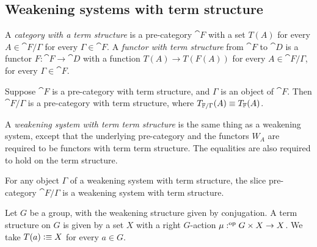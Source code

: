 \begin{comment}
\begin{eg}
In a poset with meets, the functions $W_{a,b}:{\downarrow}(b)\to{\downarrow}(a)$
given by $W_{a,b}(x)\defeq a\land x$ assemble a weakening structure, because for
any $a\leq b$ and $x,c'\leq c\leq b$ we have $a\land(c'\land x)\jdeq (a\land c')\land
(a\land x)$.  
\end{eg}

\begin{eg}
Consider the poset $(\N,\geq)$, which has a morphism from $a$ to $b$ if $a\geq b$.
On this poset, we may consider the weakening structure defined by $W_{a,b}(x)\jdeq
a+(x-b)$.
\end{eg}
\end{comment}

\subsection{Weakening systems with term structure}
\begin{defn}
A \emph{category with a term structure} is a pre-category $\cat{F}$ with a set $T(A)$ for every
$A\in\cat{F}/\Gamma$ for every $\Gamma\in\cat{F}$. A \emph{functor with term structure} from $\cat{F}$ to $\cat{D}$
is a functor $F:\cat{F}\to\cat{D}$ with a function $T(A)\to T(F(A))$ for
every $A\in\cat{F}/\Gamma$, for every $\Gamma\in\cat{F}$.
\end{defn}

\begin{defn}
Suppose $\cat{F}$ is a pre-category with term structure, and $\Gamma$ is an object of $\cat{F}$. 
Then $\cat{F}/\Gamma$ is a pre-category with term structure, where $T_{\mathbb{F}/\Gamma}(A)\equiv T_\mathbb{F}(A)$.
\end{defn}

\begin{defn}
A \emph{weakening system with term term structure} is the same thing as a weakening system,
except that the underlying pre-category and the functors $W_A$ are required to
be functors with term term structure. The equalities are also required to hold on the term structure.
\end{defn}

\begin{cor}
For any object $\Gamma$ of a weakening system with term structure, the slice pre-category
$\cat{F}/\Gamma$ is a weakening system with term structure.
\end{cor}

\begin{eg}

Let $G$ be a group, with the weakening structure given by conjugation. A term
structure on $G$ is given by a set $X$ with a right $G$-action $\mu:^{\mathrm{op}} G\times X\to X$.
We take $T(a)\vcentcolon\equiv X$ for every $a\in G$.
\end{eg}

